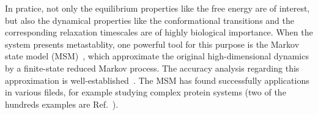 \documentclass[epjST]{svjour}
\begin{document}
In pratice, not only the equilibrium properties like the free energy are of interest,
but also the dynamical properties like the conformational transitions and the corresponding relaxation timescales
are of highly biological importance.
When the system presents metastablity,
one powerful tool for this purpose
is the Markov state model (MSM)~\cite{prinz2011probing,prinz2011markov,schuette2011markov}, which
approximate the original high-dimensional dynamics by a finite-state reduced
Markov process.
The accuracy analysis regarding  this approximation is well-established~\cite{sarich2010approximation,djurdjevac2012estimating}.
The MSM has found successfully applications in various fileds, for example studying complex protein systems
(two of the hundreds examples are Ref.~\cite{noe2009constructing,kohlhoff2014cloud}).
\end{document}
